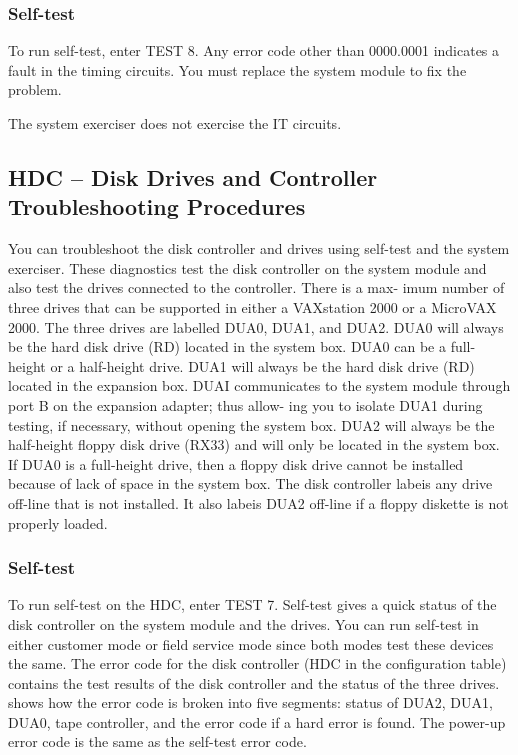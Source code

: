 \subsubsection{Self-test}

To run self-test, enter TEST 8. Any error code other than 0000.0001 indicates
a fault in the timing circuits. You must replace the system module to fix the
problem.

The system exerciser does not exercise the IT circuits.

\subsection{HDC -- Disk Drives and Controller Troubleshooting Procedures}


You can troubleshoot the disk controller and drives using self-test and the
system exerciser. These diagnostics test the disk controller on the system
module and also test the drives connected to the controller. There is a max-
imum number of three drives that can be supported in either a VAXstation
2000 or a MicroVAX 2000. The three drives are labelled DUA0, DUA1, and
DUA2. DUA0 will always be the hard disk drive (RD) located in the system
box. DUA0 can be a full-height or a half-height drive. DUA1 will always be
the hard disk drive (RD) located in the expansion box. DUAI communicates
to the system module through port B on the expansion adapter; thus allow-
ing you to isolate DUA1 during testing, if necessary, without opening the
system box. DUA2 will always be the half-height floppy disk drive (RX33)
and will only be located in the system box. If DUA0 is a full-height drive,
then a floppy disk drive cannot be installed because of lack of space in the
system box. The disk controller labeis any drive off-line that is not installed.
It also labeis DUA2 off-line if a floppy diskette is not properly loaded.

\subsubsection{Self-test}

To run self-test on the HDC, enter TEST 7. Self-test gives a quick status
of the disk controller on the system module and the drives. You can run
self-test in either customer mode or field service mode since both modes
test these devices the same. The error code for the disk controller (HDC in
the configuration table) contains the test results of the disk controller and
the status of the three drives.  shows how the error code is
broken into five segments: status of DUA2, DUA1, DUA0, tape controller,
and the error code if a hard error is found. The power-up error code is the
same as the self-test error code.

